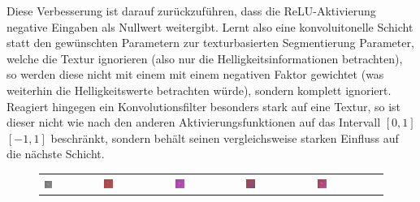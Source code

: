 Diese Verbesserung ist darauf zurückzuführen, dass die ReLU-Aktivierung negative Eingaben als Nullwert weitergibt. Lernt also \bspw eine konvoluitonelle Schicht statt den gewünschten Parametern zur texturbasierten Segmentierung Parameter, welche die Textur ignorieren (also nur die Helligkeitsinformationen betrachten), so werden diese nicht mit einem mit einem negativen Faktor gewichtet (was weiterhin die Helligkeitswerte betrachten würde), sondern komplett ignoriert. Reagiert hingegen ein Konvolutionsfilter besonders stark auf eine Textur, so ist dieser nicht wie nach den anderen Aktivierungsfunktionen auf das Intervall $\left[0, 1\right]$ \bzw $\left[-1, 1\right]$ beschränkt, sondern behält seinen vergleichsweise starken Einfluss auf die nächste Schicht.

\begin{figure}[h!]
	\begin{tabular}{C{0.19\textwidth}C{0.19\textwidth}C{0.19\textwidth}C{0.19\textwidth}C{0.19\textwidth}}
		\includegraphics[width=0.15\textwidth]{images/p03/p03_01.png} &
		\includegraphics[width=0.15\textwidth]{images/gen/activation_functions/p03_01.png_None.png} &
		\includegraphics[width=0.15\textwidth]{images/gen/activation_functions/p03_01.png_relu.png} &
		\includegraphics[width=0.15\textwidth]{images/gen/activation_functions/p03_01.png_sigmoid.png} &
		\includegraphics[width=0.15\textwidth]{images/gen/activation_functions/p03_01.png_tanh.png} \\

\end{tabular}
\end{figure}

